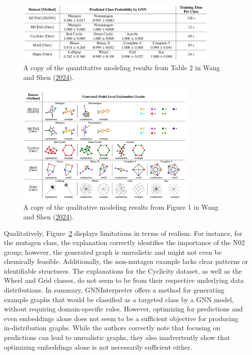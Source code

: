 \documentclass[
  11pt,
  letterpaper,
]{article}
\begin{document}
\begin{figure}

{\centering \includegraphics[width=0.9\textwidth,height=\textheight]{figures/GNNInt_prediction_results.png}

}

\caption{\label{fig-GNNInt-pred-results}A copy of the quantitative
modeling results from Table 2 in Wang and Shen
(\protect\hyperlink{ref-Wang_Shen_2024}{2024}).}

\end{figure}

\begin{figure}

{\centering \includegraphics[width=0.8\textwidth,height=\textheight]{figures/GNNInt_drawn_results.png}

}

\caption{\label{fig-GNNInt-Drawn}A copy of the qualitative modeling
results from Figure 1 in Wang and Shen
(\protect\hyperlink{ref-Wang_Shen_2024}{2024}).}

\end{figure}

Qualitatively, Figure~\ref{fig-GNNInt-Drawn} displays limitations in
terms of realism. For instance, for the mutagen class, the explanation
correctly identifies the importance of the N02 group; however, the
generated graph is unrealistic and might not even be chemically
feasible. Additionally, the non-mutagen example lacks clear patterns or
identifiable structures. The explanations for the Cyclicity dataset, as
well as the Wheel and Grid classes, do not seem to be from their
respective underlying data distributions. In summary, GNNInterpreter
offers a method for generating example graphs that would be classified
as a targeted class by a GNN model, without requiring domain-specific
rules. However, optimizing for predictions and even embeddings alone
does not seem to be a sufficient objective for producing in-distribution
graphs. While the authors correctly note that focusing on predictions
can lead to unrealistic graphs, they also inadvertently show that
optimizing embeddings alone is not necessarily sufficient either.
\end{document}

